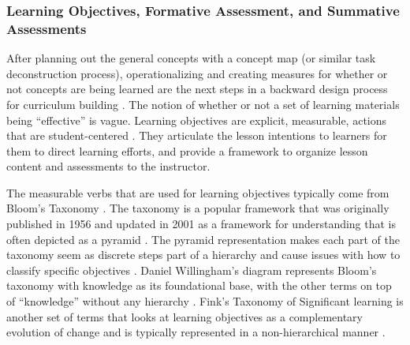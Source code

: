 \documentclass[010-intro.tex]{subfiles}
\begin{document}
    \subsubsection{Learning Objectives, Formative Assessment, and Summative Assessments}

        After planning out the general concepts with a concept map (or similar task deconstruction process),
        operationalizing and creating measures for whether or not concepts are being learned are the next
        steps in a backward design process for curriculum building
        \cite{wilson2019teaching}.
        The notion of whether or not a set of learning materials being ``effective'' is vague.
        Learning objectives are explicit, measurable, actions that are student-centered
        \cite{ambrose2010learning}.
        They articulate the lesson intentions to learners for them to direct learning efforts,
        and provide a framework to organize lesson content and assessments to the instructor.

        The measurable verbs that are used for learning objectives typically come from Bloom's Taxonomy
        \cite{ambrose2010learning, wilson2019teaching, anderson2001taxonomy}.
        The taxonomy is a popular framework that was originally published in 1956 and updated in 2001
        as a framework for understanding that is often depicted as a pyramid
        \cite{bloomTaxonomyEducationalObjectives1956, anderson2001taxonomy, dunloskyImprovingStudentsLearning2013}.
        The pyramid representation makes each part of the taxonomy seem as discrete steps part of a hierarchy
        and cause issues with how to classify specific objectives
        \cite{masapanta-carrionSystematicReviewUse2018}.
        Daniel Willingham's diagram represents Bloom's taxonomy with knowledge as its foundational base,
        with the other terms on top of ``knowledge'' without any hierarchy
        \cite{DonaldClarkPlan2020, dunloskyImprovingStudentsLearning2013}.
        Fink's Taxonomy of Significant learning is another set of terms that looks at learning objectives as a complementary
        evolution of change and is typically represented in a non-hierarchical manner
        \cite{finkCreatingSignificantLearning2013}.
\end{document}
